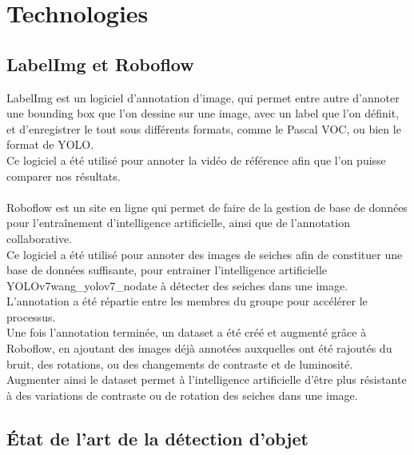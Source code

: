 \pagestyle{plain}
\chapter{Technologies}

\section{LabelImg et Roboflow}
LabelImg est un logiciel d'annotation d'image, qui permet entre autre d'annoter une bounding box que l'on dessine sur une image, avec un label que l'on définit, et d'enregistrer le tout sous différents formats, comme le Pascal VOC, ou bien le format de YOLO.\\
Ce logiciel a été utilisé pour annoter la vidéo de référence afin que l'on puisse comparer nos résultats.\\
\\
Roboflow est un site en ligne qui permet de faire de la gestion de base de données pour l'entraînement d'intelligence artificielle, ainsi que de l'annotation collaborative.\\
Ce logiciel a été utilisé pour annoter des images de seiches afin de constituer une base de données suffisante, pour entrainer l'intelligence artificielle YOLOv7{wang_yolov7_nodate} à détecter des seiches dans une image. L'annotation a été répartie entre les membres du groupe pour accélérer le processus.\\
Une fois l'annotation terminée, un dataset a été créé et augmenté grâce à Roboflow, en ajoutant des images déjà annotées auxquelles ont été rajoutés du bruit, des rotations, ou des changements de contraste et de luminosité. Augmenter ainsi le dataset permet à l'intelligence artificielle d'être plus résistante à des variations de contraste ou de rotation des seiches dans une image.\\




\section{État de l'art de la détection d'objet}

